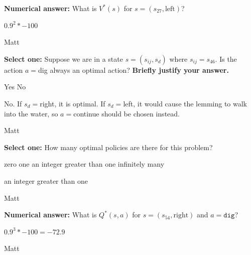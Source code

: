 \begin{parts}
\begin{subparts}
\clearpage
    
\subpart[1] \textbf{Numerical answer:} What is $V^*(s)$ for $s=(s_{27}, \text{left})$?
    \begin{tcolorbox}[fit,height=1cm, width=2cm, blank, borderline={1pt}{-2pt}]
    \end{tcolorbox}
    \begin{soln}
    $0.9^2 * -100$
    \end{soln}
    \begin{qauthor} Matt    \end{qauthor}
    
\subpart[2] \textbf{Select one:} Suppose we are in a state $s=(s_{ij}, s_d)$ where $s_{ij} = s_{46}$. Is the action $a=$dig always an optimal action? \textbf{Briefly justify your answer.}
    \begin{checkboxes}
     \choice Yes
     \choice No
    \end{checkboxes}    
    \fillwithlines{8em}
    \begin{soln}
    No. If $s_d=$right, it is optimal. If $s_d=$left, it would cause the lemming to walk into the water, so $a=$continue should be chosen instead.
    \end{soln}
    \begin{qauthor} Matt    \end{qauthor}

\subpart[1] \textbf{Select one:} How many optimal policies are there for this problem?
    \begin{checkboxes}
     \choice zero
     \choice one
     \choice an integer greater than one
     \choice infinitely many
    \end{checkboxes}
    \begin{soln}
    an integer greater than one
    \end{soln}
    \begin{qauthor} Matt    \end{qauthor}

\subpart[1] \textbf{Numerical answer:} What is $Q^*(s,a)$ for $s=(s_{54}, \text{right})$ and $a=\texttt{dig}$?
    \begin{tcolorbox}[fit,height=1cm, width=2cm, blank, borderline={1pt}{-2pt}]
    \end{tcolorbox}
    \begin{soln}
    $0.9^3 * -100 = -72.9$
    \end{soln}
    \begin{qauthor} Matt    \end{qauthor}


\end{subparts}
\end{parts}
